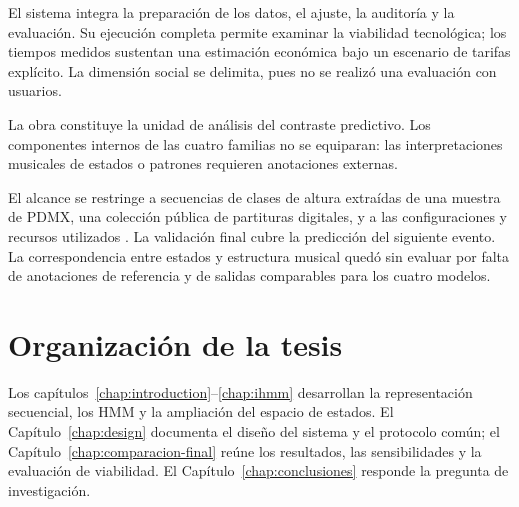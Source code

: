 El sistema integra la preparación de los datos, el ajuste, la auditoría y la evaluación. Su ejecución completa permite examinar la viabilidad tecnológica; los tiempos medidos sustentan una estimación económica bajo un escenario de tarifas explícito. La dimensión social se delimita, pues no se realizó una evaluación con usuarios.

La obra constituye la unidad de análisis del contraste predictivo. Los componentes internos de las cuatro familias no se equiparan: las interpretaciones musicales de estados o patrones requieren anotaciones externas.

El alcance se restringe a secuencias de clases de altura extraídas de una muestra de PDMX, una colección pública de partituras digitales, y a las configuraciones y recursos utilizados \cite{long2024pdmx}. La validación final cubre la predicción del siguiente evento. La correspondencia entre estados y estructura musical quedó sin evaluar por falta de anotaciones de referencia y de salidas comparables para los cuatro modelos.

\section{Organización de la tesis}

Los capítulos~\ref{chap:introduction}--\ref{chap:ihmm} desarrollan la representación secuencial, los HMM y la ampliación del espacio de estados. El Capítulo~\ref{chap:design} documenta el diseño del sistema y el protocolo común; el Capítulo~\ref{chap:comparacion-final} reúne los resultados, las sensibilidades y la evaluación de viabilidad. El Capítulo~\ref{chap:conclusiones} responde la pregunta de investigación.

